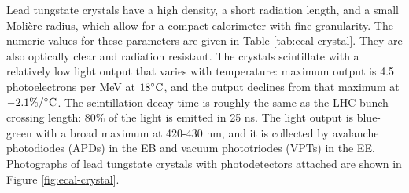 Lead tungstate crystals have a 
high density,
a short radiation length,
and a small Moli\`{e}re radius,
which allow for a compact calorimeter with fine granularity. 
The numeric values for these parameters are given in Table \ref{tab:ecal-crystal}.
They are also optically clear and radiation resistant.
The crystals scintillate with a relatively low light output
that varies with temperature: maximum output is 4.5 photoelectrons
per MeV at $18^{\circ}{\rm C}$, and the output declines from that maximum at $-2.1\%/^{\circ}{\rm C}$.
The scintillation decay time is roughly the same as the LHC bunch crossing
length: $80\%$ of the light is emitted in 25 ns.  
The light output is blue-green with a broad maximum at 420-430 nm, and it is
collected by avalanche photodiodes (APDs)
 in the EB and
vacuum phototriodes (VPTs) 
 in the EE.
Photographs of lead tungstate crystals with photodetectors attached 
are shown in Figure \ref{fig:ecal-crystal}.

